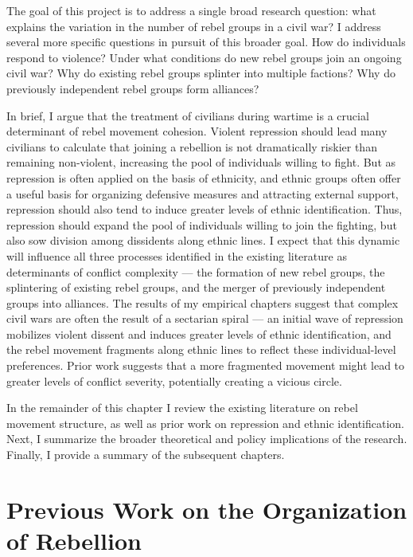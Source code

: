 \documentclass[12pt,]{book}
\theoremstyle{definition}
\theoremstyle{definition}
\theoremstyle{definition}
\theoremstyle{remark}
\begin{document}
The goal of this project is to address a single broad research question:
what explains the variation in the number of rebel groups in a civil
war? I address several more specific questions in pursuit of this
broader goal. How do individuals respond to violence? Under what
conditions do new rebel groups join an ongoing civil war? Why do
existing rebel groups splinter into multiple factions? Why do previously
independent rebel groups form alliances?

In brief, I argue that the treatment of civilians during wartime is a
crucial determinant of rebel movement cohesion. Violent repression
should lead many civilians to calculate that joining a rebellion is not
dramatically riskier than remaining non-violent, increasing the pool of
individuals willing to fight. But as repression is often applied on the
basis of ethnicity, and ethnic groups often offer a useful basis for
organizing defensive measures and attracting external support,
repression should also tend to induce greater levels of ethnic
identification. Thus, repression should expand the pool of individuals
willing to join the fighting, but also sow division among dissidents
along ethnic lines. I expect that this dynamic will influence all three
processes identified in the existing literature as determinants of
conflict complexity --- the formation of new rebel groups, the
splintering of existing rebel groups, and the merger of previously
independent groups into alliances. The results of my empirical chapters
suggest that complex civil wars are often the result of a sectarian
spiral --- an initial wave of repression mobilizes violent dissent and
induces greater levels of ethnic identification, and the rebel movement
fragments along ethnic lines to reflect these individual-level
preferences. Prior work suggests that a more fragmented movement might
lead to greater levels of conflict severity, potentially creating a
vicious circle.

In the remainder of this chapter I review the existing literature on
rebel movement structure, as well as prior work on repression and ethnic
identification. Next, I summarize the broader theoretical and policy
implications of the research. Finally, I provide a summary of the
subsequent chapters.

\hypertarget{previous-work-on-the-organization-of-rebellion}{%
\section{Previous Work on the Organization of
Rebellion}\label{previous-work-on-the-organization-of-rebellion}}
\end{document}
